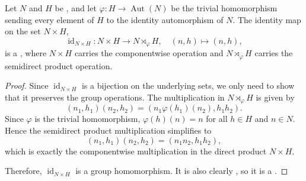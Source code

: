 \begin{proposition} \label{proposition:direct_product_is_semidirect_product_with_trivial_action}
    Let $N$ and $H$ be , and let $\varphi: H \to \operatorname{Aut}(N)$ be the trivial homomorphism sending every element of $H$ to the identity automorphism of $N$. The identity map on the set $N \times H$,
    $$\operatorname{id}_{N \times H} : N \times H \longrightarrow N \rtimes_\varphi H, \quad (n,h) \mapsto (n,h),$$
    is a , where $N \times H$ carries the componentwise  operation and $N \rtimes_\varphi H$ carries the semidirect product operation.
\end{proposition}

\begin{proof}
    Since $\operatorname{id}_{N \times H}$ is a bijection on the underlying sets, we only need to show that it preserves the group operations. The multiplication in $N \rtimes_\varphi H$ is given by
    $$ (n_1, h_1)(n_2, h_2) = (n_1 \varphi(h_1)(n_2), h_1 h_2).$$
    Since $\varphi$ is the trivial homomorphism, $\varphi(h)(n) = n$ for all $h \in H$ and $n \in N$. Hence the semidirect product multiplication simplifies to
    $$ (n_1, h_1)(n_2, h_2) = (n_1 n_2, h_1 h_2),$$
    which is exactly the componentwise multiplication in the direct product $N \times H$.

    Therefore, $\operatorname{id}_{N \times H}$ is a group homomorphism. It is also clearly , so it is a .
\end{proof}
